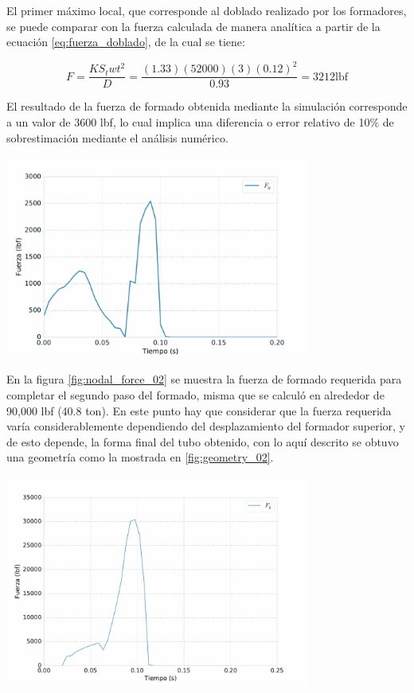 El primer máximo local, que corresponde al doblado realizado por los formadores, se puede 
comparar con la fuerza calculada de manera analítica a partir de la ecuación \ref{eq:fuerza_doblado}, 
de la cual se tiene:

$$
F = \frac{K S_{t} w t^2}{D} = \frac{(1.33)(52000)(3)(0.12)^2}{0.93} = 3212 \text{lbf}
$$

El resultado de la fuerza de formado obtenida mediante la simulación corresponde a un valor de 
3600 lbf, lo cual implica una diferencia o error relativo de 10\% de sobrestimación mediante 
el análisis numérico.

\begin{center}
\includegraphics[width=0.75\textwidth]{src/ch4/nodal_force_01.pdf}
\label{fig:nodal_force_01}
\end{center}

En la figura \ref{fig:nodal_force_02} se muestra la fuerza de formado requerida para completar el 
segundo paso del formado, misma que se calculó en alrededor de 90,000 lbf (40.8 ton). En este punto 
hay que considerar que la fuerza requerida varía considerablemente dependiendo del desplazamiento 
del formador superior, y de esto depende, la forma final del tubo obtenido, con lo aquí descrito se 
obtuvo una geometría como la mostrada en \ref{fig:geometry_02}.

\begin{center}
\includegraphics[width=0.75\textwidth]{src/ch4/nodal_force_02.pdf}
\label{fig:nodal_force_02}
\end{center}


